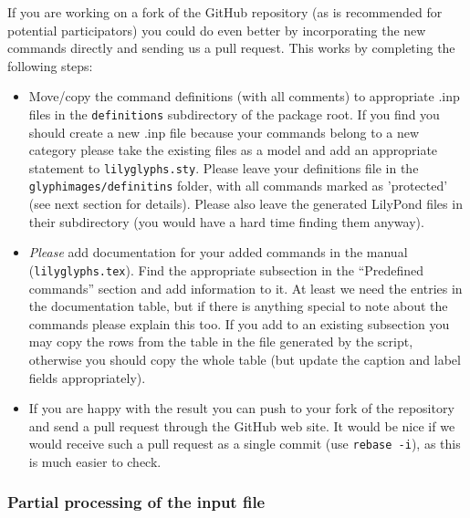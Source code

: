 \documentclass{article}
\begin{document}
If you are working on a fork of the GitHub repository (as is recommended for potential participators) you could do even better by incorporating the new commands directly and sending us a pull request.
This works by completing the following steps:
\begin{itemize}
\item Move/copy the command definitions (with all comments) to appropriate .inp files in the \texttt{definitions} subdirectory of the package root.
If you find you should create a new .inp file because your commands belong to a new category please take the existing files as a model and add an appropriate  statement to \texttt{lilyglyphs.sty}.
Please leave your definitions file in the \texttt{glyphimages/definitins} folder, with all commands marked as 'protected' (see next section for details).
Please also leave the generated LilyPond files in their subdirectory (you would have a hard time finding them anyway).
\item \emph{Please} add documentation for your added commands in the manual (\texttt{lilyglyphs.tex}).
Find the appropriate subsection in the “Predefined commands” section and add information to it.
At least we need the entries in the documentation table, but if there is anything special to note about the commands please explain this too.
If you add to an existing subsection you may copy the rows from the table in the file generated by the script, otherwise you should copy the whole table (but update the caption and label fields appropriately).
\item If you are happy with the result you can push to your fork of the repository and send a pull request through the GitHub web site.
It would be nice if we would receive such a pull request as a single commit (use \texttt{rebase -i}), as this is much easier to check.
\end{itemize}


\subsubsection{Partial processing of the input file}
\label{subsubsec:BGI_partial_processing}
\end{document}
